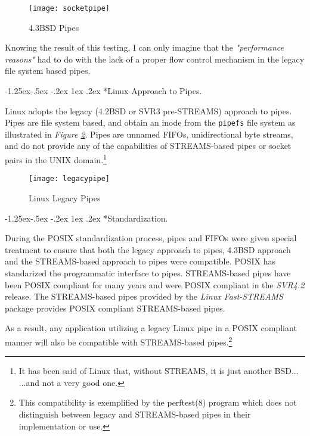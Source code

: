 \documentclass[letterpaper,final,notitlepage,twocolumn,10pt,twoside]{article}
\makeatletter
\let\normalsize\small
\let\small\footnotesize
\let\footnotesize\scriptsize
\let\scriptsize\tiny
\renewcommand\subsubsection{\@startsection{subsubsection}{3}{\z@}%
                                     {-1.25ex\@plus -.5ex \@minus -.2ex}%
                                     {1ex \@plus .2ex}%
                                     {\normalfont\normalsize\bfseries}}
\makeatother
\begin{document}
\begin{figure}[htp]
\center\texttt{[image: socketpipe]}
\caption[4.3BSD Pipes]{4.3BSD Pipes}
\label{figure:socketpipe}
\end{figure}

Knowing the result of this testing, I can only imagine that the
\textit{"performance reasons"} had to do with the lack of a proper flow
control mechanism in the legacy file system based pipes.

\subsubsection*{Linux Approach to Pipes.}

Linux adopts the legacy (4.2BSD or SVR3 pre-STREAMS) approach to pipes.  Pipes
are file system based, and obtain an inode from the \texttt{pipefs} file
system as illustrated in \textit{Figure \ref{figure:legacypipe}}.  Pipes are
unnamed FIFOs, unidirectional byte streams, and do not provide any of the
capabilities of STREAMS-based pipes or socket pairs in the UNIX
domain.\footnote{It has been said of Linux that, without STREAMS, it is just
another BSD... ...and not a very good one.}

\begin{figure}[htp]
\center\texttt{[image: legacypipe]}
\caption[Linux Legacy Pipes]{Linux Legacy Pipes}
\label{figure:legacypipe}
\end{figure}

\subsubsection*{Standardization.}

During the POSIX standardization process, pipes and FIFOs were given special
treatment to ensure that both the legacy approach to pipes, 4.3BSD approach
and the STREAMS-based approach to pipes were compatible.  POSIX has
standarized the programmatic interface to pipes.  STREAMS-based pipes have
been POSIX compliant for many years and were POSIX compliant in the
\textsl{SVR4.2} release.  The STREAMS-based pipes provided by the
\textsl{Linux Fast-STREAMS} package provides POSIX compliant STREAMS-based
pipes.

As a result, any application utilizing a legacy Linux pipe in a POSIX
compliant manner will also be compatible with STREAMS-based
pipes.\footnote{This compatibility is exemplified by the perftest(8) program
which does not distinguish between legacy and STREAMS-based pipes in their
implementation or use.}
\end{document}
